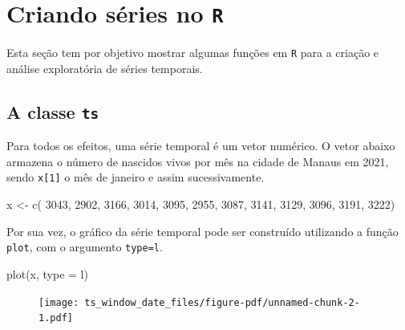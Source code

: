 \documentclass[
  letterpaper,
  DIV=11,
  numbers=noendperiod]{scrartcl}
\newenvironment{Shaded}{\begin{snugshade}}{\end{snugshade}}
\newcommand{\AttributeTok}[1]{\textcolor[rgb]{0.40,0.45,0.13}{#1}}
\newcommand{\DecValTok}[1]{\textcolor[rgb]{0.68,0.00,0.00}{#1}}
\newcommand{\FunctionTok}[1]{\textcolor[rgb]{0.28,0.35,0.67}{#1}}
\newcommand{\NormalTok}[1]{\textcolor[rgb]{0.00,0.23,0.31}{#1}}
\newcommand{\OtherTok}[1]{\textcolor[rgb]{0.00,0.23,0.31}{#1}}
\newcommand{\StringTok}[1]{\textcolor[rgb]{0.13,0.47,0.30}{#1}}
\theoremstyle{plain}
\theoremstyle{plain}
\theoremstyle{definition}
\theoremstyle{definition}
\theoremstyle{remark}
\begin{document}

\hypertarget{criando-suxe9ries-no-r}{%
\chapter{\texorpdfstring{Criando séries no
\texttt{R}}{Criando séries no R}}\label{criando-suxe9ries-no-r}}

Esta seção tem por objetivo mostrar algumas funções em \texttt{R} para a
criação e análise exploratória de séries temporais.

\hypertarget{a-classe-ts}{%
\section{\texorpdfstring{A classe
\texttt{ts}}{A classe ts}}\label{a-classe-ts}}

Para todos os efeitos, uma série temporal é um vetor numérico. O vetor
abaixo armazena o número de nascidos vivos por mês na cidade de Manaus
em 2021, sendo \texttt{x{[}1{]}} o mês de janeiro e assim
sucessivamente.

\begin{Shaded}
\begin{Highlighting}[]
\NormalTok{x }\OtherTok{\textless{}{-}} \FunctionTok{c}\NormalTok{( }\DecValTok{3043}\NormalTok{, }\DecValTok{2902}\NormalTok{, }\DecValTok{3166}\NormalTok{, }\DecValTok{3014}\NormalTok{, }\DecValTok{3095}\NormalTok{, }\DecValTok{2955}\NormalTok{, }\DecValTok{3087}\NormalTok{, }\DecValTok{3141}\NormalTok{,}
\DecValTok{3129}\NormalTok{, }\DecValTok{3096}\NormalTok{, }\DecValTok{3191}\NormalTok{, }\DecValTok{3222}\NormalTok{)}
\end{Highlighting}
\end{Shaded}

Por sua vez, o gráfico da série temporal pode ser construído utilizando
a função \texttt{plot}, com o argumento
\texttt{type=\textquotesingle{}l\textquotesingle{}}.

\begin{Shaded}
\begin{Highlighting}[]
\FunctionTok{plot}\NormalTok{(x, }\AttributeTok{type =} \StringTok{\textquotesingle{}l\textquotesingle{}}\NormalTok{)}
\end{Highlighting}
\end{Shaded}

\begin{figure}[H]

{\centering \texttt{[image: ts\_window\_date\_files/figure-pdf/unnamed-chunk-2-1.pdf]}

}

\end{figure}
\end{document}
